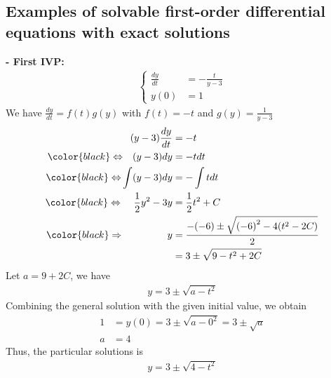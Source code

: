\documentclass[a4paper]{article}
\numberwithin{equation}{section}
\begin{document}
\subsection{Examples of solvable first-order differential equations with exact solutions}
\textbf{- First IVP:}
\begin{align*}
  \begin{cases}
    \frac{dy}{dt} & = - \frac{t}{y - 3} \\
    y(0)          & = 1
  \end{cases}
\end{align*}
We have \(\frac{dy}{dt} = f(t)g(y)\) with \(f(t) = -t\) and \(g(y) = \frac{1}{y-3}\)
\begin{align*}
  (y - 3) \frac{dy}{dt}                                     & = -t                                                \\
  {\color{black}\Leftrightarrow} ~~~ (y - 3) dy             & = -t dt                                             \\
  {\color{black}\Leftrightarrow}  \int (y - 3) dy           & = -\int tdt                                         \\
  {\color{black}\Leftrightarrow} ~~~~ \frac {1}{2} y^2 - 3y & = \frac{1}{2} t^2 + C                               \\
  {\color{black}\Rightarrow} ~~~~~~~~~~~~~~ y               & = \frac{-(-6) \pm \sqrt{{(-6)}^2 - 4(t^2 - 2C)}}{2} \\
                                                            & = 3 \pm \sqrt{9 - t^2 + 2C}
\end{align*}
Let \(a = 9 + 2C\), we have
\begin{align*}
  y = 3 \pm \sqrt{a - t^2}
\end{align*}
Combining the general solution with the given initial value, we obtain
\begin{align*}
  1 & = y(0) = 3 \pm \sqrt{a - 0^2} = 3 \pm \sqrt{a} \\
  a & = 4
\end{align*}
Thus, the particular solutions is
\begin{align*}
  y = 3 \pm \sqrt{4-t^2}
\end{align*}
\end{document}
